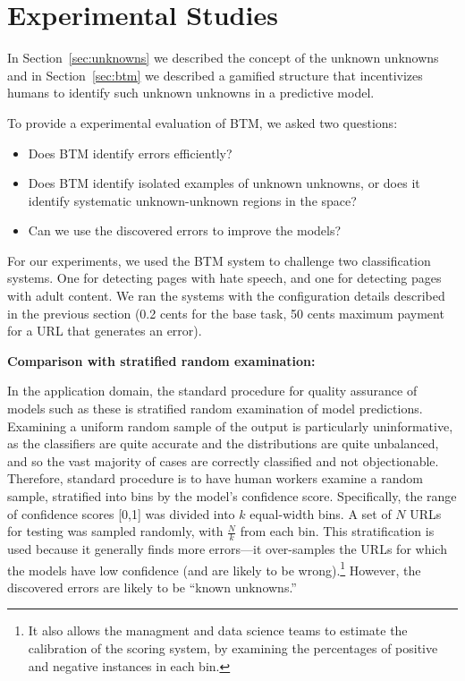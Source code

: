\section{Experimental Studies}

In Section~\ref{sec:unknowns} we described the concept of the unknown unknowns and in Section~\ref{sec:btm} we described a gamified structure that incentivizes humans to identify such unknown unknowns in a predictive model.

To provide a experimental evaluation of BTM, we asked two questions:
\begin{itemize}

\item Does BTM identify errors efficiently?

\item Does BTM identify isolated examples of unknown unknowns, or does it identify systematic unknown-unknown regions in the space?

\item Can we use the discovered errors to improve the models?

\end{itemize}

For our experiments, we used the BTM system to challenge two
classification systems. One for detecting pages with hate speech, and
one for detecting pages with adult content. We ran the systems with
the configuration details described in the previous section (0.2 cents
for the base task, 50 cents maximum payment for a URL that generates
an error).



\textbf{Comparison with stratified random examination:} 

In the application domain, the standard procedure for quality assurance of models
such as these is stratified random examination of model predictions.  
Examining a uniform random sample of the output is particularly uninformative, as the classifiers are quite accurate and the distributions are quite unbalanced, and so the vast majority of cases are correctly classified and not objectionable.  Therefore, standard procedure is to have human workers examine a random sample, stratified into bins by the model's confidence score.  Specifically, the range of confidence scores [0,1] was divided into $k$ equal-width bins.  A set of $N$ URLs for testing was sampled randomly, with $\frac{N}{k}$ from each bin.  This stratification is used because it generally finds more errors---it over-samples the URLs for which the models have low confidence (and are likely to be wrong).\footnote{It also allows the managment and data science teams to estimate the calibration of the scoring system, by examining the percentages of positive and negative instances in each bin.}  However, the discovered errors are likely to be ``known unknowns.''  

